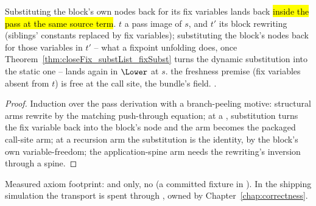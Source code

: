 \begin{theorem}
\label{thm:Lower-constToFix}
\leanok
{}
 Substituting the block's own nodes back for its fix variables lands back \hl{inside the
pass at the same source term}.
 $t$ a pass image of $s$, and $t'$ its block rewriting (siblings' constants replaced by
fix variables);  substituting the block's nodes back for those variables in $t'$ -- what a
fixpoint unfolding does, once Theorem~\ref{thm:closeFix_substList_fixSubst} turns the dynamic
substitution into the static one -- lands again in $\Lower$ at $s$.
 the freshness premise (fix variables absent from $t$) is free at the call site, the bundle's
 field.
 \stProved{}.
\end{theorem}
\begin{proof}
\leanok
{}
 Induction over the pass derivation with a branch-peeling motive: structural arms rewrite by
the matching push-through equation; at a , substitution turns the fix variable back into the
block's node and the arm becomes the packaged call-site arm; at a recursion arm the substitution is the
identity, by the block's own variable-freedom; the application-spine arm needs the rewriting's inversion
through a spine.
\end{proof}

\begin{remark}
 Measured axiom footprint:  and  only, no 
(a committed fixture in ). In the shipping simulation the transport is spent
through , owned by Chapter~\ref{chap:correctness}.
\end{remark}

